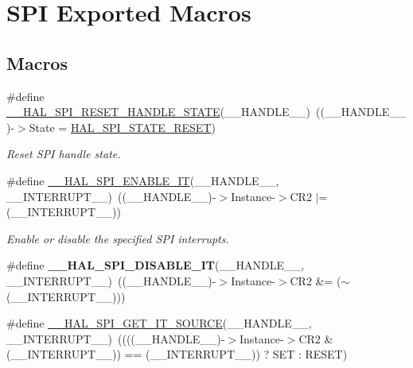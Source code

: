 \hypertarget{group___s_p_i___exported___macros}{}\section{S\+PI Exported Macros}
\label{group___s_p_i___exported___macros}
\subsection*{Macros}
\begin{DoxyCompactItemize}
\item 
\#define \hyperlink{group___s_p_i___exported___macros_ga0d846f9517715960873e854b4a0790b0}{\+\_\+\+\_\+\+H\+A\+L\+\_\+\+S\+P\+I\+\_\+\+R\+E\+S\+E\+T\+\_\+\+H\+A\+N\+D\+L\+E\+\_\+\+S\+T\+A\+TE}(\+\_\+\+\_\+\+H\+A\+N\+D\+L\+E\+\_\+\+\_\+)~((\+\_\+\+\_\+\+H\+A\+N\+D\+L\+E\+\_\+\+\_\+)-\/$>$State = \hyperlink{group___s_p_i___exported___types_gga8891cb64e76198a860172d94c638c9b4adbc218df2c9841b561282b40b3ded69d}{H\+A\+L\+\_\+\+S\+P\+I\+\_\+\+S\+T\+A\+T\+E\+\_\+\+R\+E\+S\+ET})
\begin{DoxyCompactList}\small\item\em Reset S\+PI handle state. \end{DoxyCompactList}\item 
\#define \hyperlink{group___s_p_i___exported___macros_ga76064652f6f56d8868720b5541e854f5}{\+\_\+\+\_\+\+H\+A\+L\+\_\+\+S\+P\+I\+\_\+\+E\+N\+A\+B\+L\+E\+\_\+\+IT}(\+\_\+\+\_\+\+H\+A\+N\+D\+L\+E\+\_\+\+\_\+,  \+\_\+\+\_\+\+I\+N\+T\+E\+R\+R\+U\+P\+T\+\_\+\+\_\+)~((\+\_\+\+\_\+\+H\+A\+N\+D\+L\+E\+\_\+\+\_\+)-\/$>$Instance-\/$>$C\+R2 $\vert$= (\+\_\+\+\_\+\+I\+N\+T\+E\+R\+R\+U\+P\+T\+\_\+\+\_\+))
\begin{DoxyCompactList}\small\item\em Enable or disable the specified S\+PI interrupts. \end{DoxyCompactList}\item 
\mbox{\label{group___s_p_i___exported___macros_ga47fa7321c5755bfbff1a7229fbe5b21c}} 
\#define {\bfseries \+\_\+\+\_\+\+H\+A\+L\+\_\+\+S\+P\+I\+\_\+\+D\+I\+S\+A\+B\+L\+E\+\_\+\+IT}(\+\_\+\+\_\+\+H\+A\+N\+D\+L\+E\+\_\+\+\_\+,  \+\_\+\+\_\+\+I\+N\+T\+E\+R\+R\+U\+P\+T\+\_\+\+\_\+)~((\+\_\+\+\_\+\+H\+A\+N\+D\+L\+E\+\_\+\+\_\+)-\/$>$Instance-\/$>$C\+R2 \&= ($\sim$(\+\_\+\+\_\+\+I\+N\+T\+E\+R\+R\+U\+P\+T\+\_\+\+\_\+)))
\item 
\#define \hyperlink{group___s_p_i___exported___macros_gabdaab061e4603331a0ec4b9d651df0b5}{\+\_\+\+\_\+\+H\+A\+L\+\_\+\+S\+P\+I\+\_\+\+G\+E\+T\+\_\+\+I\+T\+\_\+\+S\+O\+U\+R\+CE}(\+\_\+\+\_\+\+H\+A\+N\+D\+L\+E\+\_\+\+\_\+,  \+\_\+\+\_\+\+I\+N\+T\+E\+R\+R\+U\+P\+T\+\_\+\+\_\+)~((((\+\_\+\+\_\+\+H\+A\+N\+D\+L\+E\+\_\+\+\_\+)-\/$>$Instance-\/$>$C\+R2 \& (\+\_\+\+\_\+\+I\+N\+T\+E\+R\+R\+U\+P\+T\+\_\+\+\_\+)) == (\+\_\+\+\_\+\+I\+N\+T\+E\+R\+R\+U\+P\+T\+\_\+\+\_\+)) ? S\+ET \+: R\+E\+S\+ET)

\end{DoxyCompactItemize}
